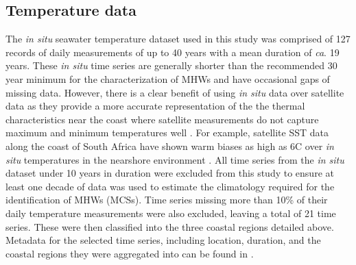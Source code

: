 \documentclass[a4paper,10pt,review]{elsarticle}
\begin{document}
\subsection{Temperature data}
The \emph{in situ} seawater temperature dataset used in this study was comprised of 127 records of daily measurements of up to 40 years with a mean duration of \emph{ca}. 19 years. These \emph{in situ} time series are generally shorter than the recommended 30 year minimum for the characterization of MHWs \citep{Hobday2016} and have occasional gaps of missing data. However, there is a clear benefit of using \emph{in situ} data over satellite data as they provide a more accurate representation of the the thermal characteristics near the coast where satellite measurements do not capture maximum and minimum temperatures well \citep[e.g.][]{Smale2009, Castillo2010}. For example, satellite SST data along the coast of South Africa have shown warm biases as high as 6\degree C over \emph{in situ} temperatures in the nearshore environment \citet{Smit2013}. All time series from the \emph{in situ} dataset under 10 years in duration were excluded from this study to ensure at least one decade of data was used to estimate the climatology required for the identification of MHWs (MCSs). Time series missing more than 10\% of their daily temperature measurements were also excluded, leaving a total of 21 time series. These were then classified into the three coastal regions detailed above. Metadata for the selected time series, including location, duration, and the coastal regions they were aggregated into can be found in .
\end{document}
